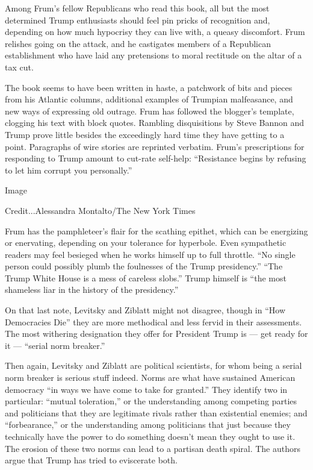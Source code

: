 Among Frum's fellow Republicans who read this book, all but the most
determined Trump enthusiasts should feel pin pricks of recognition and,
depending on how much hypocrisy they can live with, a queasy discomfort.
Frum relishes going on the attack, and he castigates members of a
Republican establishment who have laid any pretensions to moral
rectitude on the altar of a tax cut.

The book seems to have been written in haste, a patchwork of bits and
pieces from his Atlantic columns, additional examples of Trumpian
malfeasance, and new ways of expressing old outrage. Frum has followed
the blogger's template, clogging his text with block quotes. Rambling
disquisitions by Steve Bannon and Trump prove little besides the
exceedingly hard time they have getting to a point. Paragraphs of wire
stories are reprinted verbatim. Frum's prescriptions for responding to
Trump amount to cut-rate self-help: ``Resistance begins by refusing to
let him corrupt you personally.''

Image

Credit...Alessandra Montalto/The New York Times

Frum has the pamphleteer's flair for the scathing epithet, which can be
energizing or enervating, depending on your tolerance for hyperbole.
Even sympathetic readers may feel besieged when he works himself up to
full throttle. ``No single person could possibly plumb the foulnesses of
the Trump presidency.'' ``The Trump White House is a mess of careless
slobs.'' Trump himself is ``the most shameless liar in the history of
the presidency.''

On that last note, Levitsky and Ziblatt might not disagree, though in
``How Democracies Die'' they are more methodical and less fervid in
their assessments. The most withering designation they offer for
President Trump is --- get ready for it --- ``serial norm breaker.''

Then again, Levitsky and Ziblatt are political scientists, for whom
being a serial norm breaker is serious stuff indeed. Norms are what have
sustained American democracy ``in ways we have come to take for
granted.'' They identify two in particular: ``mutual toleration,'' or
the understanding among competing parties and politicians that they are
legitimate rivals rather than existential enemies; and ``forbearance,''
or the understanding among politicians that just because they
technically have the power to do something doesn't mean they ought to
use it. The erosion of these two norms can lead to a partisan death
spiral. The authors argue that Trump has tried to eviscerate both.


